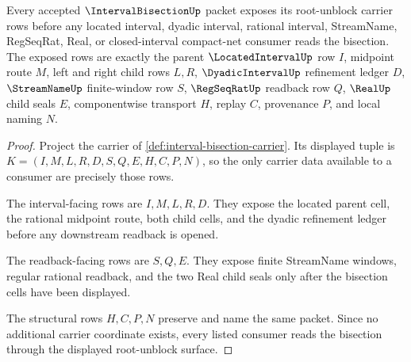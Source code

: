 \begin{theorem}
\label{thm:interval-bisection-obligation-carrier}
Every accepted $\IntervalBisectionUp$ packet exposes its root-unblock carrier rows before any located interval, dyadic interval, rational interval, StreamName, RegSeqRat, Real, or closed-interval compact-net consumer reads the bisection. The exposed rows are exactly the parent $\LocatedIntervalUp$ row $I$, midpoint route $M$, left and right child rows $L,R$, $\DyadicIntervalUp$ refinement ledger $D$, $\StreamNameUp$ finite-window row $S$, $\RegSeqRatUp$ readback row $Q$, $\RealUp$ child seals $E$, componentwise transport $H$, replay $C$, provenance $P$, and local naming $N$.
\end{theorem}
\begin{proof}
Project the carrier of \autoref{def:interval-bisection-carrier}. Its displayed tuple is $K=(I,M,L,R,D,S,Q,E,H,C,P,N)$, so the only carrier data available to a consumer are precisely those rows.

The interval-facing rows are $I,M,L,R,D$. They expose the located parent cell, the rational midpoint route, both child cells, and the dyadic refinement ledger before any downstream readback is opened.

The readback-facing rows are $S,Q,E$. They expose finite StreamName windows, regular rational readback, and the two Real child seals only after the bisection cells have been displayed.

The structural rows $H,C,P,N$ preserve and name the same packet. Since no additional carrier coordinate exists, every listed consumer reads the bisection through the displayed root-unblock surface.
\end{proof}

